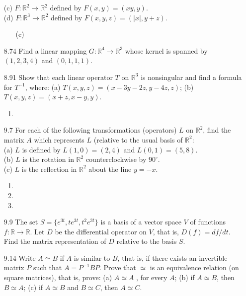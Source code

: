 \documentclass[12pt]{article}
\theoremstyle{definition}
\theoremstyle{plain}
\begin{document}
\begin{enumerate}
(c) $F:\mathbb{R}^2\rightarrow\mathbb{R}^2$ defined by $F(x,y)=(xy,y)$.\\
(d) $F:\mathbb{R}^3\rightarrow\mathbb{R}^2$ defined by $F(x,y,z)=(|x|,y+z)$.
	\begin{enumerate}
	\item[(c)]
	\end{enumerate}
\item[8.74]Find a linear mapping $G:\mathbb{R}^4\rightarrow\mathbb{R}^3$ whose kernel is spanned by $(1,2,3,4)$ and $(0,1,1,1)$.
\item[8.91]Show that each linear operator $T$ on $\mathbb{R}^3$ is nonsingular and find a formula for $T^{-1}$, where: (a) $T(x,y,z)=(x-3y-2z,y-4z,z)$; (b) $T(x,y,z)=(x+z,x-y,y)$.
	\begin{enumerate}
	\item
	\end{enumerate}
\item[9.7]For each of the following transformations (operators) $L$ on $\mathbb{R}^2$, find the matrix $A$ which represents $L$ (relative to the usual basis of $\mathbb{R}^2$:\\
(a) $L$ is defined by $L(1,0)=(2,4)$ and $L(0,1)=(5,8)$.\\
(b) $L$ is the rotation in $\mathbb{R}^2$ counterclockwise by $90^\circ$.\\
(c) $L$ is the reflection in $\mathbb{R}^2$ about the line $y=-x$.
	\begin{enumerate}
	\item
	\item
	\item
	\end{enumerate}
\item[9.9]The set $S=\{e^{3t},te^{3t},t^2e^{3t}\}$ is a basis of a vector space $V$ of functions $f: \mathbb{R}\rightarrow\mathbb{R}$. Let $D$ be the differential operator on $V$, that is, $D(f)=df/dt$. Find the matrix representation of $D$ relative to the basis $S$.
\item[9.14]Write $A\simeq B$ if $A$ is similar to $B$, that is, if there exists an invertible matrix $P$ such that $A=P^{-1}BP$. Prove that $\simeq$ is an equivalence relation (on square matrices), that is, prove: (a) $A\simeq A$ , for every $A$; (b) if $A \simeq B$, then $B\simeq A$; (c) if $A\simeq B$ and $B\simeq C$, then $A\simeq C$.\\


\end{enumerate}
\end{document}
